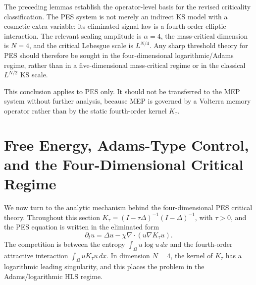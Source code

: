 \documentclass[pdflatex,sn-mathphys-num]{sn-jnl}%
\theoremstyle{thmstyleone}
\theoremstyle{thmstyletwo}
\theoremstyle{thmstylethree}
\begin{document}
The preceding lemmas establish the operator-level basis for the revised
criticality classification.  The PES system is not merely an indirect
KS model with a cosmetic extra variable; its eliminated signal law
is a fourth-order elliptic interaction.  The relevant scaling amplitude is
\(\alpha=4\), the mass-critical dimension is \(N=4\), and the critical
Lebesgue scale is \(L^{N/4}\).  Any sharp threshold theory for PES should
therefore be sought in the four-dimensional logarithmic/Adams regime, rather
than in a five-dimensional mass-critical regime or in the classical
\(L^{N/2}\) KS scale.

This conclusion applies to PES only.  It should not be transferred to the MEP
system without further analysis, because MEP is governed by a Volterra memory
operator rather than by the static fourth-order kernel \(K_\tau\).


\section{Free Energy, Adams-Type Control, and the Four-Dimensional Critical Regime}
\label{sec:free-energy-adams}

We now turn to the analytic mechanism behind the four-dimensional PES
critical theory.  Throughout this section \(K_\tau=(I-\tau\Delta)^{-1}
(I-\Delta)^{-1}\), with \(\tau>0\), and the PES equation is written in the
eliminated form
\begin{equation}
        \partial_t u=\Delta u-\chi\nabla\cdot(u\nabla K_\tau u).
\label{PES-eliminated}
\end{equation}
The competition is between the entropy \(\int_\Omega u\log u\,dx\) and the
fourth-order attractive interaction \(\int_\Omega uK_\tau u\,dx\).  In
dimension \(N=4\), the kernel of \(K_\tau\) has a logarithmic leading
singularity, and this places the problem in the Adams/logarithmic
HLS regime.
\end{document}
